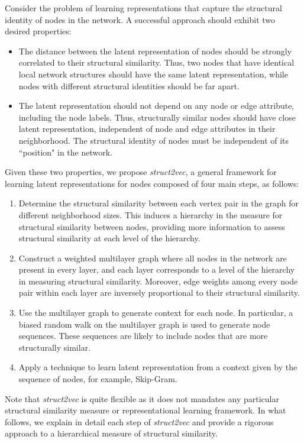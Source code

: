 \documentclass[sigconf]{acmart}
\begin{document}
Consider the problem of learning representations that capture the structural identity of nodes in the network. A successful approach should exhibit two desired properties: 
\begin{itemize}
\item
The distance between the latent representation of nodes should be strongly correlated to their structural similarity. Thus, two nodes that have identical local network structures should have the same latent representation, while nodes with different structural identities should be far apart. 

\item
The latent representation should not depend on any node or edge attribute, including the node labels. Thus, structurally similar nodes should have close latent representation, independent of node and edge attributes in their neighborhood. The structural identity of nodes must be independent of its ``position" in the network. 
\end{itemize}
Given these two properties, we propose \textit{struct2vec}, a general framework for learning latent representations for nodes composed of four main steps, as follows:
\begin{enumerate}
\item
Determine the structural similarity between each vertex pair in the graph for different neighborhood sizes. This induces a hierarchy in the measure for structural similarity between nodes, providing more information to assess structural similarity at each level of the hierarchy.

\item
Construct a weighted multilayer graph where all nodes in the network are present in every layer, and each layer corresponds to a level of the hierarchy in measuring structural similarity. Moreover, edge weights among every node pair within each layer are inversely proportional to their structural similarity.

\item
Use the multilayer graph to generate context for each node. In particular, a biased random walk on the multilayer graph is used to generate node sequences. These sequences are likely to include nodes that are more structurally similar.

\item
Apply a technique to learn latent representation from a context given by the sequence of nodes, for example, Skip-Gram. 
\end{enumerate}
Note that \textit{struct2vec} is quite flexible as it does not mandates any particular structural similarity measure or representational learning framework. In what follows, we explain in detail each step of \textit{struct2vec} and provide a rigorous approach to a hierarchical measure of structural similarity. 
\end{document}
